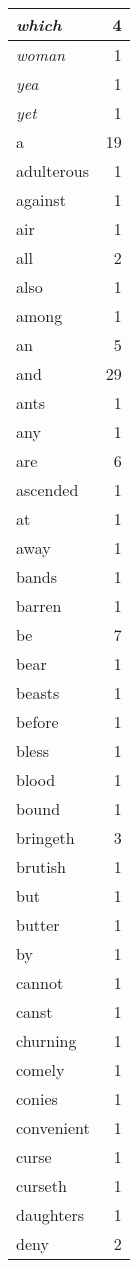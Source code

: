 \begin{center}
\begin{longtable}{l|r}
\emph{which} & 4\\ \hline 
\emph{woman} & 1\\ \hline 
\emph{yea} & 1\\ \hline 
\emph{yet} & 1\\ \hline 
a & 19\\ \hline 
adulterous & 1\\ \hline 
against & 1\\ \hline 
air & 1\\ \hline 
all & 2\\ \hline 
also & 1\\ \hline 
among & 1\\ \hline 
an & 5\\ \hline 
and & 29\\ \hline 
ants & 1\\ \hline 
any & 1\\ \hline 
are & 6\\ \hline 
ascended & 1\\ \hline 
at & 1\\ \hline 
away & 1\\ \hline 
bands & 1\\ \hline 
barren & 1\\ \hline 
be & 7\\ \hline 
bear & 1\\ \hline 
beasts & 1\\ \hline 
before & 1\\ \hline 
bless & 1\\ \hline 
blood & 1\\ \hline 
bound & 1\\ \hline 
bringeth & 3\\ \hline 
brutish & 1\\ \hline 
but & 1\\ \hline 
butter & 1\\ \hline 
by & 1\\ \hline 
cannot & 1\\ \hline 
canst & 1\\ \hline 
churning & 1\\ \hline 
comely & 1\\ \hline 
conies & 1\\ \hline 
convenient & 1\\ \hline 
curse & 1\\ \hline 
curseth & 1\\ \hline 
daughters & 1\\ \hline 
deny & 2\\ \hline 

\end{longtable}
\end{center}
